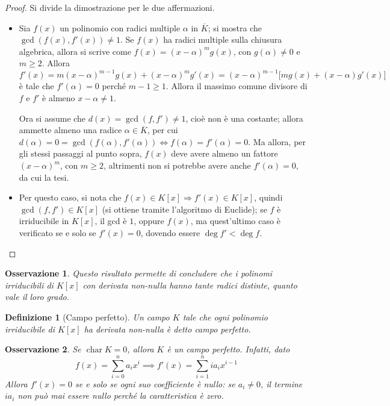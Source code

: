 \documentclass[12pt]{scrartcl}
\theoremstyle{style}
\newtheorem{definizione}{Definizione}[section]
\newtheorem{osservazione}{Osservazione}[section]
\numberwithin{equation}{subsection}
\begin{document}
\begin{proof}
	Si divide la dimostrazione per le due affermazioni.
	\begin{itemize}
		\item Sia $f(x)$ un polinomio con radici multiple $\alpha $ in $\overline{K}$; si mostra che $\operatorname{gcd}(f(x),f'(x)) \neq 1$.
			Se $f(x)$ ha radici multiple sulla chiusura algebrica, allora si scrive come $f(x) = (x-\alpha )^m g(x)$, con $g(\alpha ) \neq 0$ e $m\ge 2$.
			Allora 
			\[
				f'(x) = m (x-\alpha )^{m-1} g(x) + (x-\alpha )^m g'(x) = (x-\alpha )^{m-1} \big[m g(x) + (x-\alpha ) g'(x)\big]
			\] 
			\`e tale che $f'(\alpha ) = 0$ perch\'e $m-1\ge 1$.
			Allora il massimo comune divisore di $f$ e $f'$ \`e almeno $x-\alpha \neq 1$.

			Ora si assume che $d(x) = \operatorname{gcd}(f,f')\neq 1 $, cio\`e non \`e una costante; allora ammette almeno una radice $\alpha \in \overline{K}$, per cui $d(\alpha ) = 0 =\operatorname{gcd}(f(\alpha ),f'(\alpha )) \iff f(\alpha ) = f'(\alpha ) = 0$.
			Ma allora, per gli stessi passaggi al punto sopra, $f(x)$ deve avere almeno un fattore $(x-\alpha )^m$, con $m\ge 2$, altrimenti non si potrebbe avere anche $f'(\alpha ) = 0$, da cui la tesi.
		\item Per questo caso, si nota che $f(x) \in K[x]\Rightarrow f'(x) \in K[x]$, quindi $\operatorname{gcd}(f,f') \in K[x]$ (si ottiene tramite l'algoritmo di Euclide); se $f$ \`e irriducibile in $K[x]$, il gcd \`e $1$, oppure $f(x)$, ma quest'ultimo caso \`e verificato se e solo se $f'(x) = 0$, dovendo essere $\deg f' < \deg f$.
	\end{itemize}
\end{proof}
\begin{osservazione}
	Questo risultato permette di concludere che i polinomi irriducibili di $K[x]$ con derivata non-nulla hanno tante radici distinte, quanto vale il loro grado.
\end{osservazione}
\begin{definizione}
	[Campo perfetto]
	Un campo $K$ tale che ogni polinomio irriducibile di $K[x]$ ha derivata non-nulla \`e detto \textit{campo perfetto}.
\end{definizione}
\begin{osservazione}
Se $\operatorname{char}  K = 0$, allora $K$ \`e un campo perfetto.
Infatti, dato
\[
f(x) = \sum_{i=0}^{n} a_ix^i \implies f'(x) = \sum_{i=1}^{n} ia_ix^{i-1}
\] 
Allora $f'(x) = 0$ se e solo se ogni suo coefficiente \`e nullo: se $a_i\neq 0$, il termine $i a_i$ non pu\`o mai essere nullo perch\'e la caratteristica \`e zero.
\end{osservazione}
\end{document}
